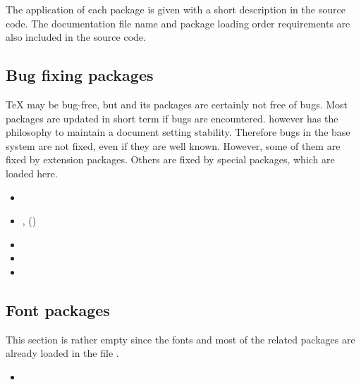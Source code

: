 The application of each package is given with a short description in the source code. The documentation file name and package loading order requirements are also included in the source code. 


\subsection{Bug fixing packages}
\label{sec:packages:bugfix}

\TeX{} may be bug-free, but \latex and its packages are certainly not free of bugs.  Most packages are updated in short term if bugs are encountered. \latex however has the philosophy to maintain a document setting stability. Therefore bugs in the base \latex system are not fixed, even if they are well known. However, some of them are fixed by extension packages. Others are fixed by special packages, which are loaded here.

\begin{itemize}[noitemsep]
\item {}
\item {}, ()
\item {}
\item {}
\item {}
\end{itemize}


\subsection{Font packages}
\label{sec:packages:fonts}

This section is rather empty since the fonts and most of the related packages are already loaded in the file .

\begin{itemize}[noitemsep]
\item {}
\end{itemize}


